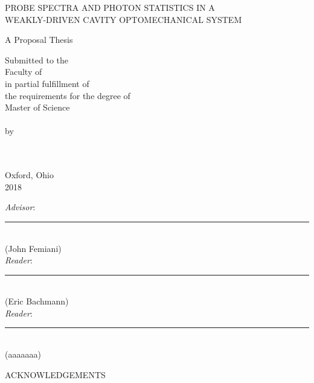 \documentclass[a4paper, 11pt, oneside]{Thesis}
\begin{document}
\thispagestyle{empty}

\frontmatter

\onehalfspacing

\begin{titlepage}
\begin{center}
PROBE SPECTRA AND PHOTON STATISTICS IN A \\ WEAKLY-DRIVEN CAVITY OPTOMECHANICAL SYSTEM

\vspace{1.5cm}

A Proposal Thesis \\

\vspace{0.5cm}

Submitted to the \\
Faculty of \univname \\
in partial fulfillment of \\
the requirements for the degree of \\
Master of Science \\
\deptname \\
by \\
\author{} \\
\univname \\
Oxford, Ohio \\
2018

\vspace{1.5cm}

\emph{Advisor}: \rule[-0.1cm]{8cm}{0.01cm} \\
(John Femiani) \\
\vspace{1.5cm}
\emph{Reader}: \rule[-0.1cm]{8cm}{0.01cm} \\
(Eric Bachmann) \\
\vspace{1.5cm}
\emph{Reader}: \rule[-0.1cm]{8cm}{0.01cm} \\
(aaaaaaa) \\
\end{center}
\end{titlepage}

\if@xetex
	\cleardoublepage
\else
	\ifpdf
		\cleardoublepage
	\else
		\cleardoublepage
	\fi
\fi

\setcounter{page}{2}
\setcounter{tocdepth}{2}
\listoffigures

\newpage

\begin{center} ACKNOWLEDGEMENTS \end{center}
\end{document}
